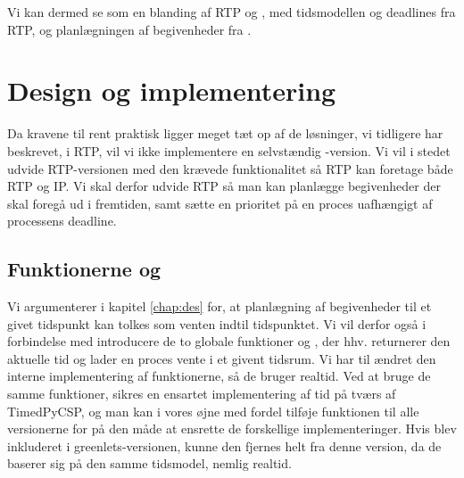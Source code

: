 Vi kan dermed se \is som en blanding af RTP og \des, med tidsmodellen og deadlines fra RTP, og planlægningen af begivenheder fra \des. 



\section{Design og implementering} 

Da kravene til \is rent praktisk ligger meget tæt op af de løsninger, vi tidligere har beskrevet, i RTP, vil vi ikke implementere en selvstændig \ip-version. Vi vil i stedet udvide RTP-versionen med den krævede funktionalitet så RTP kan foretage både RTP og IP.
Vi skal derfor udvide RTP så man kan planlægge begivenheder der skal foregå ud i fremtiden, samt sætte en prioritet på en proces uafhængigt af processens deadline. 


\subsection{Funktionerne  og }

Vi argumenterer i kapitel \ref{chap:des} for, at planlægning af begivenheder til et givet tidspunkt kan tolkes som venten indtil tidspunktet. Vi vil derfor også i forbindelse med \ip introducere de to globale funktioner  og , der hhv. returnerer den aktuelle tid og lader en proces vente i et givent tidsrum. Vi har til \is ændret den interne implementering af funktionerne, så de bruger realtid. Ved at bruge de samme funktioner, sikres en ensartet implementering af tid på tværs af TimedPyCSP, og man kan i vores øjne med fordel tilføje funktionen  til alle \pycsp versionerne for på den måde at ensrette de forskellige implementeringer. Hvis  blev inkluderet i greenlets-versionen, kunne den fjernes helt fra denne version, da de baserer sig på den samme tidsmodel, nemlig realtid.

